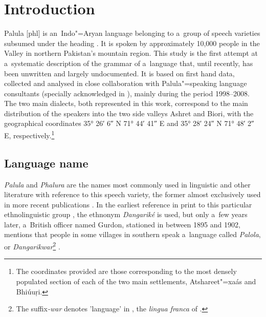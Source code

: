 \chapter{Introduction}
\label{chap:1}

Palula [phl] is an~Indo"=Aryan language belonging to a~group of speech varieties subsumed under the heading
\iliShina. It is spoken by approximately 10,000 people in the \iliChitral Valley in northern Pakistan's
mountain region. This study is the first attempt at a~systematic description of the grammar of
a~language that, until recently, has been unwritten and largely undocumented. It is based on first
hand data, collected and analysed in close collaboration with Palula"=speaking language consultants
(specially acknowledged in ), mainly during the period 1998--2008. The two main
dialects, both represented in this work, correspond to the main distribution of the speakers into
the two side valleys Ashret and Biori, with the geographical coordinates 35° 26′ 6″ N 71° 44′ 41″ E and 35° 28′ 24″ N 71° 48′ 2″ E, respectively.\footnote{The coordinates provided are those corresponding to the most densely populated section of each of the two main settlements, Atshareet"=xaás and Bhiúuṛi.}

\section{Language name}
\label{sec:1-1}

\textit{Palula} and \textit{Phalura} are the names most commonly used in linguistic and other
literature with reference to this speech variety, the former almost exclusively used in more recent
publications \citep{cacopardo2001,bashir2003,heegardpetersen2006,schmidtkohistani2008,perder2013,baart2014}. In the earliest reference in print to this particular ethnolinguistic group
\citep[64]{biddulph1986}, the ethnonym \textit{Dangariké} is used, but only a~few years later,
a~British officer named Gurdon, stationed in \iliChitral between 1895 and 1902, mentions that people in
some villages in southern \iliChitral speak a~language called \textit{Palola}, or
\textit{Dangarikwar}\footnote{The  suffix\textit{-war} denotes 'language' in \iliKhowar, the
  \textit{lingua franca} of \iliChitral.} \citep{morgenstierne1941}.


